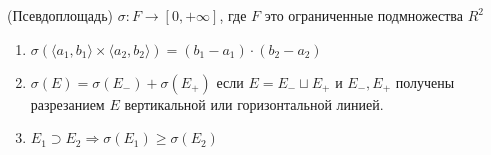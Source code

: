 \begin{definition}(Псевдоплощадь) $\sigma : F \rightarrow [0, +\infty]$, где $F$ это ограниченные подмножества $R^2$
    \begin{enumerate}
        \item $\sigma(\langle a_1, b_1\rangle \times \langle a_2, b_2\rangle) = (b_1 - a_1) \cdot (b_2 - a_2)$

        \item $\sigma(E) = \sigma(E_-) + \sigma(E_+)$ если $E = E_- \sqcup E_+$ и $E_-, E_+$ получены разрезанием $E$ вертикальной или
        горизонтальной линией.

        \item $E_1 \supset E_2 \Rightarrow \sigma(E_1) \geq \sigma(E_2)$ 
    \end{enumerate}
    
\end{definition}

